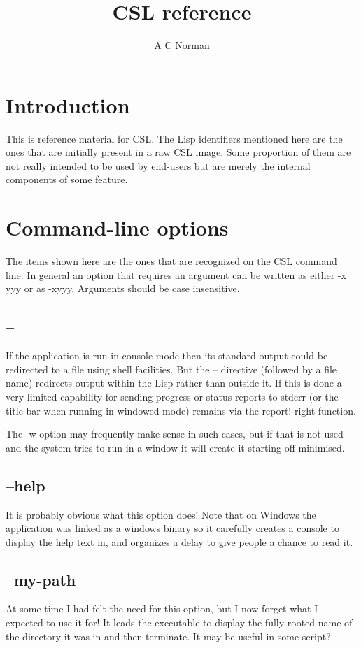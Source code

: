 \documentclass[a4paper,11pt]{article}
\title{CSL reference}
\author{A C Norman}
\begin{document}
   \maketitle
\section{Introduction}
   This is reference material for CSL. The Lisp identifiers mentioned here
   are the ones that are initially present in a raw CSL image. Some
   proportion of them are not really intended to be used by end-users but
   are merely the internal components of some feature.

\section{Command-line options}
   The items shown here are the ones that are recognized on the CSL command
   line. In general an option that requires an argument can be written as either
   {\ttfamily -x yyy} or as {\ttfamily -xyyy}. Arguments should be case
   insensitive. 

\subsection{\ttfamily --}
   If the application is run in console mode then its standard output could
   be redirected to a file using shell facilities. But the {\ttfamily --}
   directive (followed by a file name) redirects output within the Lisp rather
   than outside it. If this is done a very limited capability for sending
   progress or status reports to stderr (or the title-bar when running in windowed
   mode) remains via the {\ttfamily report!-right} function.
  
   The {\ttfamily -w} option may frequently make sense in such cases, but if that
   is not used and the system tries to run in a window it will create it
   starting off minimised.

\subsection{\ttfamily --help}
   It is probably obvious what this option does! Note that on Windows the
   application was linked as a windows binary so it carefully creates a
   console to display the help text in, and organizes a delay to give
   people a chance to read it.

\subsection{\ttfamily --my-path}
   At some time I had felt the need for this option, but I now forget what I
   expected to use it for! It leads the executable to display the fully
   rooted name of the directory it was in and then terminate. It may be useful
   in some script?
\end{document}
